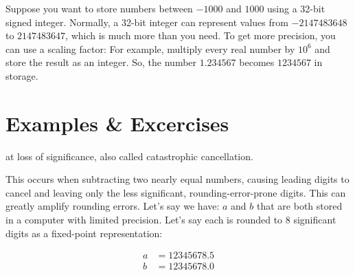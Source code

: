  Suppose you want to store numbers between $-1000$ and $1000$ using a 32-bit signed integer. 
Normally, a 32-bit integer can represent values from $-2147483648$ to $2147483647$, which is much more than you need. 
To get more precision, you can use a scaling factor: For example, multiply every real number by $10^6$ and store the 
result as an integer. So, the number $1.234567$ becomes $1234567$ in storage.








 








\newpage
\section{Examples \& Excercises}





 at loss of significance, also called catastrophic cancellation.

This occurs when subtracting two nearly equal numbers, causing leading digits to cancel and leaving only the less significant, rounding-error-prone digits.
This can greatly amplify rounding errors. Let's say we have:
 $a$ and $b$ that are both stored in a computer with limited precision. 
Let’s say each is rounded to 8 significant digits as a fixed-point representation:

\begin{align*}
    a &= 12345678.5  \\
    b &= 12345678.0 
\end{align*}

